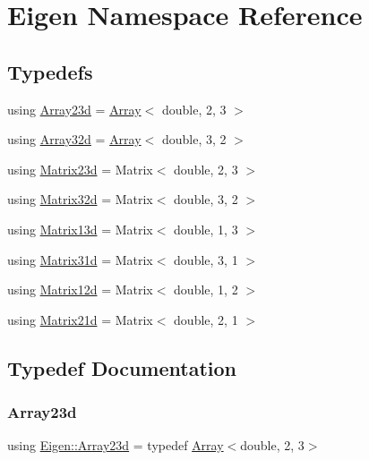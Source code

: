 \hypertarget{namespaceEigen}{}\section{Eigen Namespace Reference}
\label{namespaceEigen}
\subsection*{Typedefs}
\begin{DoxyCompactItemize}
\item 
using \hyperlink{namespaceEigen_a85d2f732c47805529131ffd537ad3b77}{Array23d} = \hyperlink{Includes_8h_abd9de33944f934950000c3929e14ad8d}{Array}$<$ double, 2, 3 $>$
\item 
using \hyperlink{namespaceEigen_a5035244c17b9361d1a3a2ff9e6abe744}{Array32d} = \hyperlink{Includes_8h_abd9de33944f934950000c3929e14ad8d}{Array}$<$ double, 3, 2 $>$
\item 
using \hyperlink{namespaceEigen_a6b59c2ed598454edf0ba0b2be5487582}{Matrix23d} = Matrix$<$ double, 2, 3 $>$
\item 
using \hyperlink{namespaceEigen_a4bc13f7bc164b152307bec23b85f81ab}{Matrix32d} = Matrix$<$ double, 3, 2 $>$
\item 
using \hyperlink{namespaceEigen_a212f6d493e3c7168dafacfc1c93b09df}{Matrix13d} = Matrix$<$ double, 1, 3 $>$
\item 
using \hyperlink{namespaceEigen_a21256313243afb53cb924a5852253dac}{Matrix31d} = Matrix$<$ double, 3, 1 $>$
\item 
using \hyperlink{namespaceEigen_a275c6f0ba3c6575f4c8cd8e229866654}{Matrix12d} = Matrix$<$ double, 1, 2 $>$
\item 
using \hyperlink{namespaceEigen_a6d712066fa86ab18ae218970bd3c93d3}{Matrix21d} = Matrix$<$ double, 2, 1 $>$
\end{DoxyCompactItemize}


\subsection{Typedef Documentation}
\mbox{\label{namespaceEigen_a85d2f732c47805529131ffd537ad3b77}} 
\subsubsection{\texorpdfstring{Array23d}{Array23d}}
{\footnotesize\ttfamily using \hyperlink{namespaceEigen_a85d2f732c47805529131ffd537ad3b77}{Eigen\+::\+Array23d} = typedef \hyperlink{Includes_8h_abd9de33944f934950000c3929e14ad8d}{Array}$<$double, 2, 3$>$}

